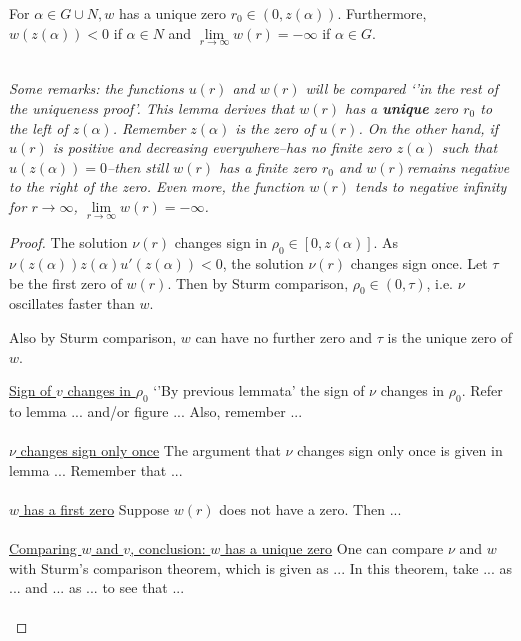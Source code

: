 \begin{lemma}\label{wq}For $\alpha\in G\cup N,w$ has a unique zero $r_0\in(0,z(\alpha)).$ Furthermore, $w(z(\alpha))<0$ if $\alpha\in N$ and $\underset{r\to\infty}{\lim}w(r)=-\infty$ if $\alpha\in G$.

\emph{}\\[11pt]\emph{Some remarks: the functions $u(r)$ and $w(r)$ will be compared `'in the rest of the uniqueness proof'. This lemma derives that $w(r)$ has a \textbf{unique} zero $r_0$ to the left of $z(\alpha)$. Remember $z(\alpha)$ is the zero of $u(r)$. On the other hand, if $u(r)$ is positive and decreasing everywhere--has no finite zero $z(\alpha)$ such that $u(z(\alpha))=0$--then still $w(r)$ has a finite zero $r_0$ and $w(r)$remains negative to the right of the zero. Even more, the function $w(r)$ tends to negative infinity for $r\to\infty$, $\underset{r\to\infty}{\lim}w(r)=-\infty$.}\\[11pt]

\begin{proof}
The solution $\nu(r)$ changes sign in $\rho_0\in[0,z(\alpha)]$. As $\nu(z(\alpha))z(\alpha)u'(z(\alpha))<0$, the solution $\nu(r)$ changes sign once. Let $\tau$ be the first zero of $w(r)$. Then by Sturm comparison, $\rho_0\in(0,\tau)$, i.e. $\nu$ oscillates faster than $w$.

Also by Sturm comparison, $w$ can have no further zero and $\tau$ is the unique zero of $w$.

\underline{Sign of $v$ changes in $\rho_0$} `'By previous lemmata' the sign of $\nu$ changes in $\rho_0$. Refer to lemma ... and/or figure ... Also, remember ...\\ \\

\underline{$\nu$ changes sign only once} The argument that $\nu$ changes sign only once is given in lemma ... Remember that ...\\ \\

\underline{$w$ has a first zero} Suppose $w(r)$ does not have a zero. Then ...\\ \\

\underline{Comparing $w$ and $v$, conclusion: $w$ has a unique zero} One can compare $\nu$ and $w$ with Sturm's comparison theorem, which is given as ... In this theorem, take ... as ... and ... as ... to see that ...\\ \\


\end{proof}
\end{lemma}
